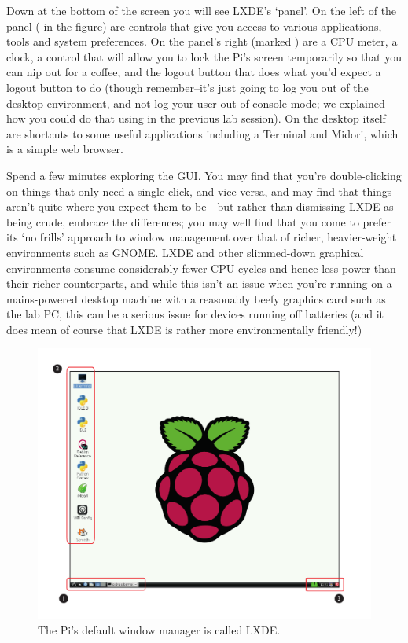 Down at the bottom of the screen you will see LXDE's `panel'. On the left of the panel (\protect{} in the figure) are controls that give you access to various applications, tools and system preferences. On the panel's right (marked \protect{}) are a CPU meter, a clock, a control that will allow you to lock the Pi's screen temporarily so that you can nip out for a coffee, and the logout button that does what you'd expect a logout button to do (though remember--it's just going to log you out of the desktop environment, and not log your user out of console mode; we explained how you could do that using  in the previous lab session). On the desktop itself are shortcuts to some useful applications including a Terminal and Midori, which is a simple web browser. 

Spend a few minutes exploring the GUI. You may find that you're double-clicking on things that only need a single click, and vice versa, and may find that things aren't quite where you expect them to be---but rather than dismissing LXDE as being crude, embrace the differences; you may well find that you come to prefer its `no frills' approach to window management over that of richer, heavier-weight environments such as GNOME. LXDE and other slimmed-down graphical environments consume considerably fewer CPU cycles and hence less power than their richer counterparts, and while this isn't an issue when you're running on a mains-powered desktop machine with a reasonably beefy graphics card such as the lab PC, this can be a serious issue for devices running off batteries (and it does mean of course that LXDE is rather more environmentally friendly!)

\begin{figure}
\centerline{\includegraphics[width=14cm]{images/lxde-desktop}}
\caption{The Pi's default window manager is called LXDE.}\label{figure:lxde-desktop}
\end{figure}


